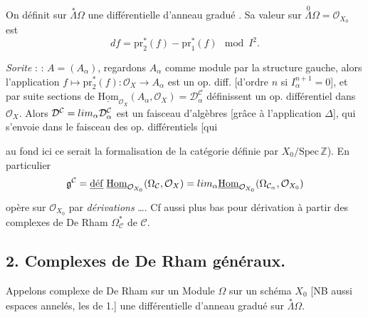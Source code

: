\documentclass[11pt,a4paper]{article}
\begin{document}
On définit  sur $\overset{*}{\Lambda}\Omega$ une différentielle d'anneau
gradué . Sa valeur sur
$\overset{0}{\Lambda}\Omega = \mathcal{O}_{X_0}$ est
\[
df = \mathrm{pr}_2^*(f) - \mathrm{pr}_1^*(f) \mod I^2 .
\]

\emph{Sorite} :  : $A = (A_\alpha)$, regardons $A_\alpha$ comme
module par la structure gauche, alors l'application
$f \mapsto \mathrm{pr}_2^*(f) : \mathcal{O}_X \to A_\alpha$ est un op. diff.
[d'ordre $n$ si $I_\alpha^{n+1} = 0$], et par suite 
\struck{\ill{}} sections de
$\underline{\mathrm{Hom}}_{\mathcal{O}_X}(A_\alpha, \mathcal{O}_X) =
\mathcal{D}^{\mathcal{C}}_\alpha$ définissent un op. différentiel dans
$\mathcal{O}_X$. Alors
$\mathcal{D}^{\mathcal{C}} = \varinjlim_\alpha \mathcal{D}^{\mathcal{C}}_\alpha$
est un faisceau d'algèbres  [grâce à l'application
$\Delta$], qui s'envoie dans le faisceau des op. différentiels [qui

au fond ici ce serait la formalisation de la catégorie \ill{} définie par
$X_0/\mathrm{Spec}\,\mathbb{Z}$). En particulier
\[
\mathfrak{g}^{\mathcal{C}} = \struck{\mathrm{d\acute{e}f}}\;
\underline{\mathrm{Hom}}_{\mathcal{O}_{X_0}}(\Omega_{\mathcal{C}}, \mathcal{O}_X)
= \varinjlim_{\alpha} \underline{\mathrm{Hom}}_{\mathcal{O}_{X_0}}(\Omega_{\mathcal{C}_\alpha}, \mathcal{O}_{X_0})
\]
opère sur $\mathcal{O}_{X_0}$ par \emph{dérivations} …. Cf aussi plus bas
pour  dérivation à partir des complexes de De Rham
$\Omega^{*}_{\mathcal{C}}$ de $\mathcal{C}$.

\subsection*{2. Complexes de De Rham généraux.}

Appelons complexe de De Rham  sur un \struck{\ill{}}
Module  $\Omega$ sur un schéma $X_0$ [NB
 aussi \ill{} espaces annelés, \ill{}
 les  de 1.] une
\struck{\ill{}} différentielle d'anneau gradué sur
$\overset{*}{\Lambda}\Omega$.
\end{document}

